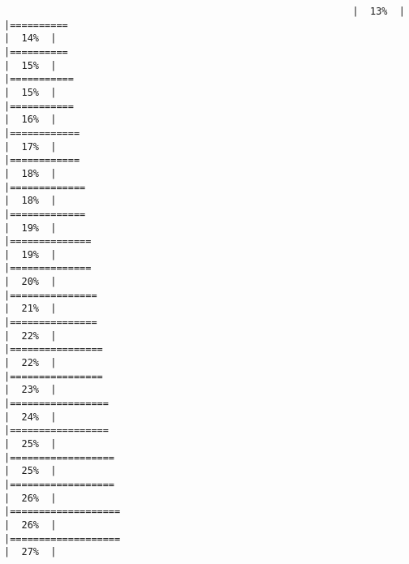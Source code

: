 \documentclass[
]{book}
\begin{document}
\begin{verbatim}
                                                            |  13%  |                                                                              |==========                                                            |  14%  |                                                                              |==========                                                            |  15%  |                                                                              |===========                                                           |  15%  |                                                                              |===========                                                           |  16%  |                                                                              |============                                                          |  17%  |                                                                              |============                                                          |  18%  |                                                                              |=============                                                         |  18%  |                                                                              |=============                                                         |  19%  |                                                                              |==============                                                        |  19%  |                                                                              |==============                                                        |  20%  |                                                                              |===============                                                       |  21%  |                                                                              |===============                                                       |  22%  |                                                                              |================                                                      |  22%  |                                                                              |================                                                      |  23%  |                                                                              |=================                                                     |  24%  |                                                                              |=================                                                     |  25%  |                                                                              |==================                                                    |  25%  |                                                                              |==================                                                    |  26%  |                                                                              |===================                                                   |  26%  |                                                                              |===================                                                   |  27%  |                                                                              
\end{verbatim}
\end{document}
